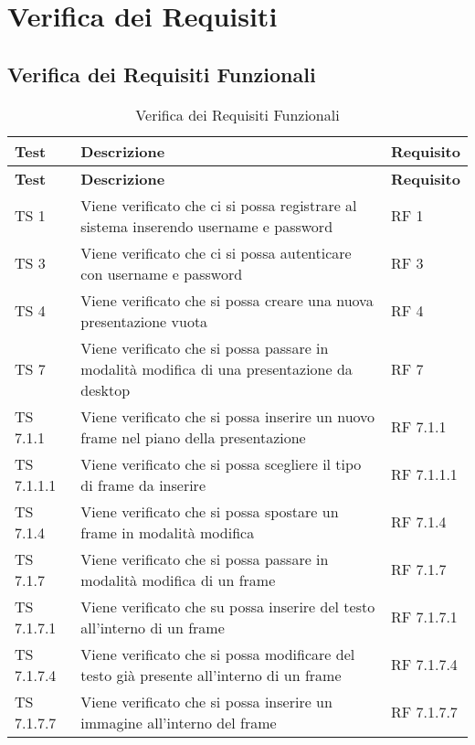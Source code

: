 \section{Verifica dei Requisiti}{
\subsection{Verifica dei Requisiti Funzionali}{
		\renewcommand*{\arraystretch}{1.4}
		\begin{longtable} [c]{| p{3cm} | p{6cm} |p{3cm}|}
			\caption{Verifica dei Requisiti Funzionali \label{tab:verReqFunz}}\\
			 \hline
			 \textbf{Test} & \textbf{Descrizione} & \textbf{Requisito} \\
			 \hline
			 \endfirsthead
			 \hline
			 \textbf{Test} & \textbf{Descrizione} & \textbf{Requisito} \\
			 \hline
			\endhead
			 \hline
			 \endfoot
			 \hline
			 \endlastfoot
			TS 1 & Viene verificato che ci si possa registrare al sistema inserendo username e password & RF 1\\
			\hline
			TS 3 & Viene verificato che ci si possa autenticare con username e password & RF 3\\
			\hline
			TS 4 & Viene verificato che si possa creare una nuova presentazione vuota & RF 4\\
			\hline
			TS 7 & Viene verificato che si possa passare in modalità modifica di una presentazione da desktop & RF 7\\
			\hline
			TS 7.1.1 & Viene verificato che si possa inserire un nuovo frame nel piano della presentazione & RF 7.1.1\\
			\hline
			TS 7.1.1.1 & Viene verificato che si possa scegliere il tipo di frame da inserire & RF 7.1.1.1\\
			\hline
			TS 7.1.4 & Viene verificato che si possa spostare un frame in modalità modifica & RF 7.1.4\\
			\hline
			TS 7.1.7 & Viene verificato che si possa passare in modalità modifica di un frame & RF 7.1.7\\
			\hline
			TS 7.1.7.1 & Viene verificato che su possa inserire del testo all'interno di un frame & RF 7.1.7.1\\
			\hline
			TS 7.1.7.4 & Viene verificato che si possa modificare del testo già presente all'interno di un frame & RF 7.1.7.4\\
			\hline
			TS 7.1.7.7 & Viene verificato che si possa inserire un immagine all'interno del frame & RF 7.1.7.7\\

\end{longtable}}}
